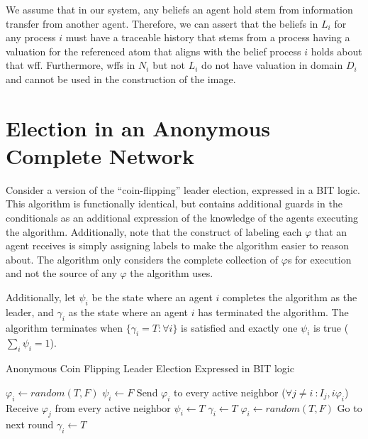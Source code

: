 We assume that in our system, any beliefs an agent hold stem from information transfer from another agent.
Therefore, we can assert that the beliefs in $L_i$ for any process $i$ must have a traceable history that stems from a process having a valuation for the referenced atom that aligns with the belief process $i$ holds about that wff.
Furthermore, wffs in $N_i$ but not $L_i$ do not have valuation in domain $D_i$ and cannot be used in the construction of the image.

\section{Election in an Anonymous Complete Network}

Consider a version of the ``coin-flipping'' leader election, expressed in a BIT logic.
This algorithm is functionally identical, but contains additional guards in the conditionals as an additional expression of the knowledge of the agents executing the algorithm.
Additionally, note that the construct of labeling each $\varphi$ that an agent receives is simply assigning labels to make the algorithm easier to reason about.
The algorithm only considers the complete collection of $\varphi$s for execution and not the source of any $\varphi$ the algorithm uses.

Additionally, let $\psi_i$ be the state where an agent $i$ completes the algorithm as the leader, and $\gamma_i$ as the state where an agent $i$ has terminated the algorithm.
The algorithm terminates when $\{\gamma_i = T : \forall i \}$ is satisfied and exactly one $\psi_i$ is true ($\sum_i \psi_i = 1$).

\begin{algorithm}
\caption{Anonymous Coin Flipping Leader Election Expressed in BIT logic}
\label{alg:coinflip}
\begin{algorithmic}[1]
\small
\State $\varphi_i \gets random(T,F)$
\State $\psi_i \gets F$
\State Send $\varphi_i$ to every active neighbor ($\forall j \neq i\ : I_j,i \varphi_i$)
\State Receive $\varphi_j$ from every active neighbor 
	\State $\psi_i \gets T$
	\State $\gamma_i \gets T$
	\State $\varphi_i \gets random(T,F)$
	\State Go to next round
	\State $\gamma_i \gets T$
\EndIf
\end{algorithmic}
\end{algorithm}

